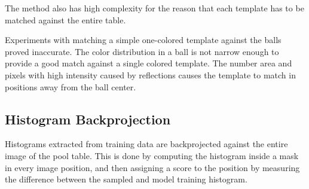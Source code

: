 The method also has high complexity for the reason that each template has to be matched against the entire table.

Experiments with matching a simple one-colored template against the balls proved inaccurate. The color distribution in a ball is not narrow enough to provide a good match against a single colored template. The number area and pixels with high intensity caused by reflections causes the template to match in positions away from the ball center.

\subsection{Histogram Backprojection}
Histograms extracted from training data are backprojected against the entire image of the pool table. This is done by computing the histogram inside a mask in every image position, and then assigning a score to the position by measuring the difference between the sampled and model training histogram.


